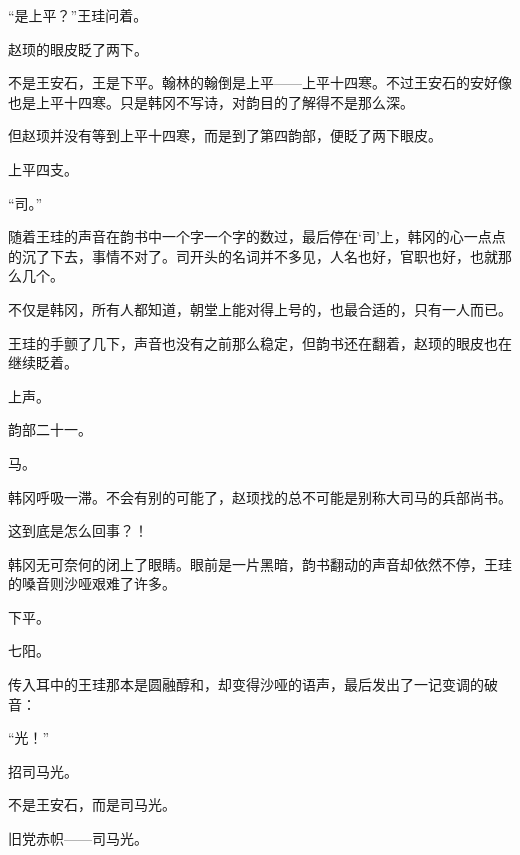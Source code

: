 “是上平？”王珪问着。

赵顼的眼皮眨了两下。

不是王安石，王是下平。翰林的翰倒是上平——上平十四寒。不过王安石的安好像也是上平十四寒。只是韩冈不写诗，对韵目的了解得不是那么深。

但赵顼并没有等到上平十四寒，而是到了第四韵部，便眨了两下眼皮。

上平四支。

“司。”

随着王珪的声音在韵书中一个字一个字的数过，最后停在‘司’上，韩冈的心一点点的沉了下去，事情不对了。司开头的名词并不多见，人名也好，官职也好，也就那么几个。

不仅是韩冈，所有人都知道，朝堂上能对得上号的，也最合适的，只有一人而已。

王珪的手颤了几下，声音也没有之前那么稳定，但韵书还在翻着，赵顼的眼皮也在继续眨着。

上声。

韵部二十一。

马。

韩冈呼吸一滞。不会有别的可能了，赵顼找的总不可能是别称大司马的兵部尚书。

这到底是怎么回事？！

韩冈无可奈何的闭上了眼睛。眼前是一片黑暗，韵书翻动的声音却依然不停，王珪的嗓音则沙哑艰难了许多。

下平。

七阳。

传入耳中的王珪那本是圆融醇和，却变得沙哑的语声，最后发出了一记变调的破音：

“光！”

招司马光。

不是王安石，而是司马光。

旧党赤帜——司马光。

